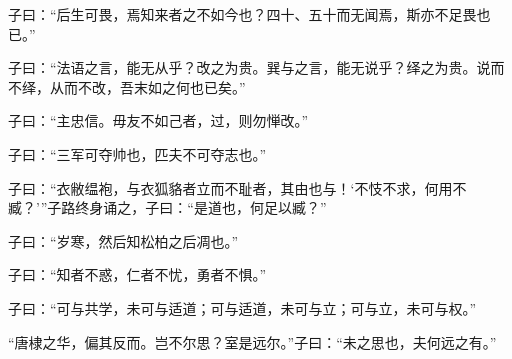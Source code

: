 \documentclass[12pt,a4paper]{ctexbook}
\begin{document}
子曰：“后生可畏，焉知来者之不如今也？四十、五十而无闻焉，斯亦不足畏也已。”\par
子曰：“法语之言，能无从乎？改之为贵。巽与之言，能无说乎？绎之为贵。说而不绎，从而不改，吾末如之何也已矣。”\par
子曰：“主忠信。毋友不如己者，过，则勿惮改。”\par
子曰：“三军可夺帅也，匹夫不可夺志也。”\par
子曰：“衣敝缊袍，与衣狐貉者立而不耻者，其由也与！‘不忮不求，何用不臧？’”子路终身诵之，子曰：“是道也，何足以臧？”\par
子曰：“岁寒，然后知松柏之后凋也。”\par
子曰：“知者不惑，仁者不忧，勇者不惧。”\par
子曰：“可与共学，未可与适道；可与适道，未可与立；可与立，未可与权。”\par
“唐棣之华，偏其反而。岂不尔思？室是远尔。”子曰：“未之思也，夫何远之有。”\par
\end{document}
